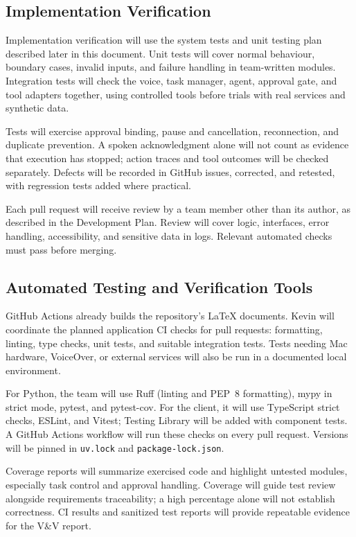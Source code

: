 \documentclass[12pt, titlepage]{article}
\begin{document}
\subsection{Implementation Verification}

Implementation verification will use the system tests and unit testing plan
described later in this document. Unit tests will cover normal behaviour,
boundary cases, invalid inputs, and failure handling in team-written modules.
Integration tests will check the voice, task manager, agent, approval gate,
and tool adapters together, using controlled tools before trials with real
services and synthetic data.

Tests will exercise approval binding, pause and cancellation, reconnection,
and duplicate prevention. A spoken acknowledgment alone will not count as
evidence that execution has stopped; action traces and tool outcomes will be
checked separately. Defects will be recorded in GitHub issues, corrected, and
retested, with regression tests added where practical.

Each pull request will receive review by a team member other than its author,
as described in the Development Plan. Review will cover logic, interfaces,
error handling, accessibility, and sensitive data in logs. Relevant automated
checks must pass before merging.

\subsection{Automated Testing and Verification Tools}

GitHub Actions already builds the repository's LaTeX documents. Kevin will
coordinate the planned application CI checks for pull requests: formatting,
linting, type checks, unit tests, and suitable integration tests. Tests needing
Mac hardware, VoiceOver, or external services will also be run in a documented
local environment.

For Python, the team will use Ruff (linting and PEP~8 formatting), mypy in
strict mode, pytest, and pytest-cov. For the client, it will use TypeScript
strict checks, ESLint, and Vitest; Testing Library will be added with component
tests. A GitHub Actions workflow will run these checks on every pull request.
Versions will be pinned in \texttt{uv.lock} and \texttt{package-lock.json}.

Coverage reports will summarize exercised code and highlight untested modules,
especially task control and approval handling. Coverage will guide test review
alongside requirements traceability; a high percentage alone will not establish
correctness. CI results and sanitized test reports will provide repeatable
evidence for the V\&V report.
\end{document}
